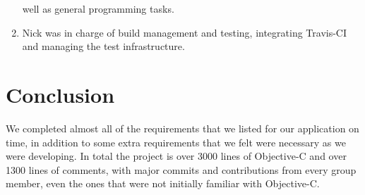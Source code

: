 \documentclass[11pt]{article}
\begin{document}
\begin{enumerate}
well as general programming tasks.
\item Nick was in charge of build management and testing, integrating Travis-CI and managing the test infrastructure.
\end{enumerate}

\section{Conclusion}
We completed almost all of the requirements that we listed for our application on time, in addition to some extra requirements that we felt were necessary as we were developing. In total the project is over 3000 lines of Objective-C and over 1300 lines of comments, with major commits and contributions from every group member, even the ones that were not initially familiar with Objective-C. 
\end{document}
